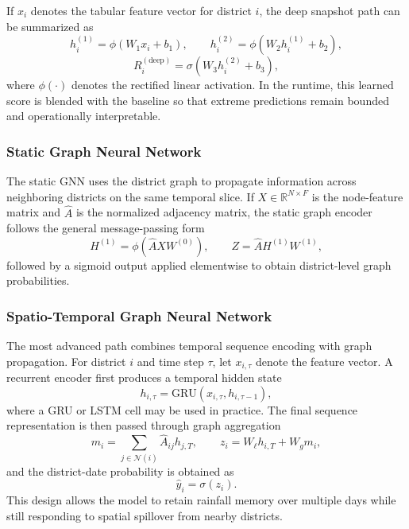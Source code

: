 \documentclass[pdflatex,sn-mathphys-num]{sn-jnl}
\begin{document}
If $x_i$ denotes the tabular feature vector for district $i$, the deep snapshot path can be summarized as
\begin{equation}
h_i^{(1)} = \phi(W_1 x_i + b_1), \qquad
h_i^{(2)} = \phi(W_2 h_i^{(1)} + b_2),
\end{equation}
\begin{equation}
R_i^{(\mathrm{deep})} = \sigma(W_3 h_i^{(2)} + b_3),
\end{equation}
where $\phi(\cdot)$ denotes the rectified linear activation. In the runtime, this learned score is blended with the baseline so that extreme predictions remain bounded and operationally interpretable.

\subsubsection{Static Graph Neural Network}

The static GNN uses the district graph to propagate information across neighboring districts on the same temporal slice. If $X \in \mathbb{R}^{N \times F}$ is the node-feature matrix and $\hat{A}$ is the normalized adjacency matrix, the static graph encoder follows the general message-passing form
\begin{equation}
H^{(1)} = \phi(\hat{A} X W^{(0)}), \qquad
Z = \hat{A} H^{(1)} W^{(1)},
\label{eq:static_gnn}
\end{equation}
followed by a sigmoid output applied elementwise to obtain district-level graph probabilities.

\subsubsection{Spatio-Temporal Graph Neural Network}

The most advanced path combines temporal sequence encoding with graph propagation. For district $i$ and time step $\tau$, let $x_{i,\tau}$ denote the feature vector. A recurrent encoder first produces a temporal hidden state
\begin{equation}
h_{i,\tau} = \mathrm{GRU}(x_{i,\tau}, h_{i,\tau-1}),
\label{eq:gru_encoder}
\end{equation}
where a GRU or LSTM cell may be used in practice. The final sequence representation is then passed through graph aggregation
\begin{equation}
m_i = \sum_{j \in \mathcal{N}(i)} \hat{A}_{ij} h_{j,T},
\qquad
z_i = W_{\ell} h_{i,T} + W_g m_i,
\label{eq:stgnn_graph}
\end{equation}
and the district-date probability is obtained as
\begin{equation}
\hat{y}_i = \sigma(z_i).
\label{eq:stgnn_output}
\end{equation}
This design allows the model to retain rainfall memory over multiple days while still responding to spatial spillover from nearby districts.
\end{document}
